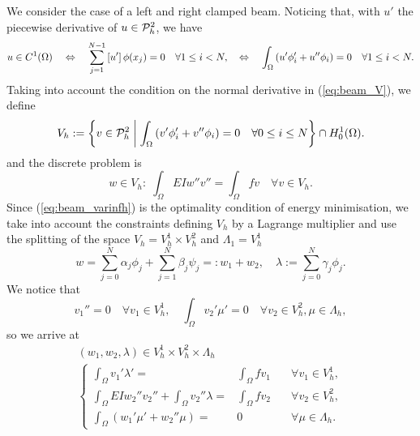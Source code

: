 We consider the case of a left and right clamped beam. Noticing that, with $u'$ the piecewise derivative of $u\in \mathcal{P}^2_h$, we have
%
\begin{equation}\label{eq:beam_C1P2}
u\in C^1(\Omega) 
\quad\Leftrightarrow\quad \sum_{j=1}^{N-1} \left[u'\right]\phi(x_j)=0 \quad\forall 1\le i< N,
\quad\Leftrightarrow\quad \int_{\Omega} \left(u'\phi'_i + u''\phi_i\right)=0 \quad\forall 1\le i< N.
\end{equation}
%
Taking into account the condition on the normal derivative in (\ref{eq:beam_V}), we define
%
\begin{equation}\label{eq:beam_Vh}
V_h := \left\{v\in \mathcal{P}^2_h\;\middle|\;\int_{\Omega} \left(v'\phi'_i + v''\phi_i\right)=0 \quad\forall 0\le i\le N\right\}\cap H^1_0(\Omega).
\end{equation}
%
and the discrete problem is
%
\begin{equation}\label{eq:beam_varinfh}
w\in V_h:\; \int_{\Omega}EIw''v'' =\int_{\Omega}fv\quad \forall v\in V_h.
\end{equation}
%
Since (\ref{eq:beam_varinfh}) is the optimality condition of energy minimisation, we take into account the constraints defining $V_h$ by a Lagrange multiplier and use the splitting of the space $V_h=V_h^1\times V_h^2$ and $\Lambda_1=V_h^1$
%
\begin{equation}\label{eq:}
w = \sum_{j=0}^N \alpha_j \phi_j +  \sum_{j=1}^N \beta_j \psi_j =: w_1 + w_2,\quad \lambda := \sum_{j=0}^N \gamma_j \phi_j.
\end{equation}
%
We notice that
%
\begin{equation}\label{eq:}
v_1''=0\quad\forall v_1\in V_h^1,\quad \int_{\Omega} v_2'\mu'=0\quad\forall v_2\in V_h^2, \mu\in\Lambda_h,
\end{equation}
%
so we arrive at
%
\begin{align*}
(w_1,w_2,\lambda)\in V_h^1\times V_h^2 \times \Lambda_h\\
\left\{
\begin{aligned}
\int_{\Omega}v_1'\lambda' =&\int_{\Omega}fv_1\quad& \forall v_1\in V_h^1,\\
\int_{\Omega}EIw_2''v_2'' +  \int_{\Omega} v_2''\lambda=&\int_{\Omega}fv_2\quad& \forall v_2\in V_h^2,\\
\int_{\Omega} \left(w_1'\mu' + w_2''\mu\right)=&0\quad&\forall \mu\in \Lambda_h.
\end{aligned}
\right.
\end{align*}
%


